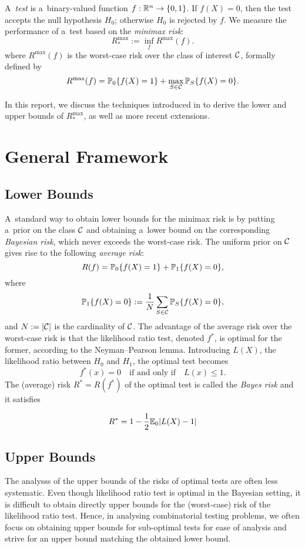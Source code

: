 \documentclass[10pt, oneside]{article}
\begin{document}
A~\textit{test} is a~binary-valued function $f:{\mathbb R}^n \to\{
0,1\}$. If
$f(X)=0$, then the test accepts the null hypothesis $H_0$;
otherwise $H_0$ is rejected by $f$.
We measure the performance of a~test based on the \textit{minimax risk}:
\[
R_*^{\max} := \inf_{f} R^{\max}(f).
\]
where $R^{\max}(f)$ is the worst-case risk over the class of interest ${\mathcal C}$, formally defined by
\[
R^{\max}(f) = \mathbb{P}_0\{f(X)=1\}
+ \max_{S\in{\mathcal C}} \mathbb{P}_S\{f(X)=0\}.
\]

In this report, we discuss the techniques introduced in \cite{arias2012correlation, addario2010combinatorial, arias2011detection} to derive the lower and upper bounds of $R_*^{\max}$, as well as more recent extensions.

\section{General Framework}

\subsection{Lower Bounds}
A~standard way to obtain lower bounds for the minimax risk is by putting a~prior on the class ${\mathcal C}$ and obtaining a~lower bound on the corresponding \textit{Bayesian risk}, which never exceeds the worst-case risk. The
uniform prior on ${\mathcal C}$ gives rise to the following \textit{average risk}:
\[
R(f) = \mathbb{P}_0\{f(X)=1\}
+ \mathbb{P}_1\{f(X)=0\},
\]
where
\[
\mathbb{P}_1\{f(X)=0\} := \frac{1}{N}\sum_{S\in{\mathcal C}} \mathbb{P}_S\{f(X)=0\},
\]
and $N := |{\mathcal C}|$ is the cardinality of ${\mathcal C}$.
The advantage of the average risk over the worst-case risk is that the likelihood ratio test, denoted $f^*$, is optimal for the former, according to the Neyman--Pearson lemma. Introducing $L(X)$, the likelihood ratio between $H_0$ and $H_1$, the optimal test becomes
%
\[
f^*(x) = 0  \quad\mbox{if and only if}\quad   L(x) \le 1.
\]
The
(average)
risk $R^*=R(f^*)$ of the optimal test is called the
\textit{Bayes risk} and it satisfies

\[
R^* = 1 - \frac{1}{2} \mathbb{E}_0 |L(X) - 1|
\]

\subsection{Upper Bounds}
The analysss of the upper bounds of the risks of optimal tests are often less systematic. Even though likelihood ratio test is optimal in the
Bayesian setting, it is difficult to obtain directly upper bounds for the (worst-case) risk
of the likelihood ratio test. Hence, in analysing combinatorial testing problems, we often focus on obtaining upper bounds for sub-optimal tests for ease of analysis and strive for an upper bound matching the obtained lower bound.
\end{document}
